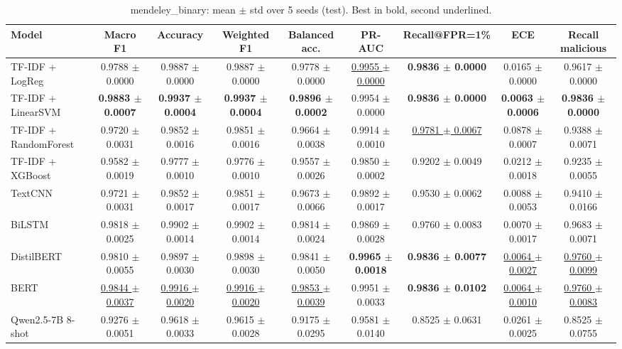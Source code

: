 \begin{table}[t]
\centering
\small
\caption{mendeley\_binary: mean $\pm$ std over 5 seeds (test). Best in bold, second underlined.}
\label{tab:mendeley_binary}
\begin{tabular}{lcccccccc}
\toprule
Model & Macro F1 & Accuracy & Weighted F1 & Balanced acc. & PR-AUC & Recall@FPR=1\% & ECE & Recall malicious \\
\midrule
TF-IDF + LogReg & 0.9788 $\pm$ 0.0000 & 0.9887 $\pm$ 0.0000 & 0.9887 $\pm$ 0.0000 & 0.9778 $\pm$ 0.0000 & \underline{0.9955 $\pm$ 0.0000} & \textbf{0.9836 $\pm$ 0.0000} & 0.0165 $\pm$ 0.0000 & 0.9617 $\pm$ 0.0000 \\
TF-IDF + LinearSVM & \textbf{0.9883 $\pm$ 0.0007} & \textbf{0.9937 $\pm$ 0.0004} & \textbf{0.9937 $\pm$ 0.0004} & \textbf{0.9896 $\pm$ 0.0002} & 0.9954 $\pm$ 0.0000 & \textbf{0.9836 $\pm$ 0.0000} & \textbf{0.0063 $\pm$ 0.0006} & \textbf{0.9836 $\pm$ 0.0000} \\
TF-IDF + RandomForest & 0.9720 $\pm$ 0.0031 & 0.9852 $\pm$ 0.0016 & 0.9851 $\pm$ 0.0016 & 0.9664 $\pm$ 0.0038 & 0.9914 $\pm$ 0.0010 & \underline{0.9781 $\pm$ 0.0067} & 0.0878 $\pm$ 0.0007 & 0.9388 $\pm$ 0.0071 \\
TF-IDF + XGBoost & 0.9582 $\pm$ 0.0019 & 0.9777 $\pm$ 0.0010 & 0.9776 $\pm$ 0.0010 & 0.9557 $\pm$ 0.0026 & 0.9850 $\pm$ 0.0002 & 0.9202 $\pm$ 0.0049 & 0.0212 $\pm$ 0.0018 & 0.9235 $\pm$ 0.0055 \\
TextCNN & 0.9721 $\pm$ 0.0031 & 0.9852 $\pm$ 0.0017 & 0.9851 $\pm$ 0.0017 & 0.9673 $\pm$ 0.0066 & 0.9892 $\pm$ 0.0017 & 0.9530 $\pm$ 0.0062 & 0.0088 $\pm$ 0.0053 & 0.9410 $\pm$ 0.0166 \\
BiLSTM & 0.9818 $\pm$ 0.0025 & 0.9902 $\pm$ 0.0014 & 0.9902 $\pm$ 0.0014 & 0.9814 $\pm$ 0.0024 & 0.9869 $\pm$ 0.0028 & 0.9760 $\pm$ 0.0083 & 0.0070 $\pm$ 0.0017 & 0.9683 $\pm$ 0.0071 \\
DistilBERT & 0.9810 $\pm$ 0.0055 & 0.9897 $\pm$ 0.0030 & 0.9898 $\pm$ 0.0030 & 0.9841 $\pm$ 0.0050 & \textbf{0.9965 $\pm$ 0.0018} & \textbf{0.9836 $\pm$ 0.0077} & \underline{0.0064 $\pm$ 0.0027} & \underline{0.9760 $\pm$ 0.0099} \\
BERT & \underline{0.9844 $\pm$ 0.0037} & \underline{0.9916 $\pm$ 0.0020} & \underline{0.9916 $\pm$ 0.0020} & \underline{0.9853 $\pm$ 0.0039} & 0.9951 $\pm$ 0.0033 & \textbf{0.9836 $\pm$ 0.0102} & \underline{0.0064 $\pm$ 0.0010} & \underline{0.9760 $\pm$ 0.0083} \\
Qwen2.5-7B 8-shot & 0.9276 $\pm$ 0.0051 & 0.9618 $\pm$ 0.0033 & 0.9615 $\pm$ 0.0028 & 0.9175 $\pm$ 0.0295 & 0.9581 $\pm$ 0.0140 & 0.8525 $\pm$ 0.0631 & 0.0261 $\pm$ 0.0025 & 0.8525 $\pm$ 0.0755 \\
\bottomrule
\end{tabular}
\end{table}
